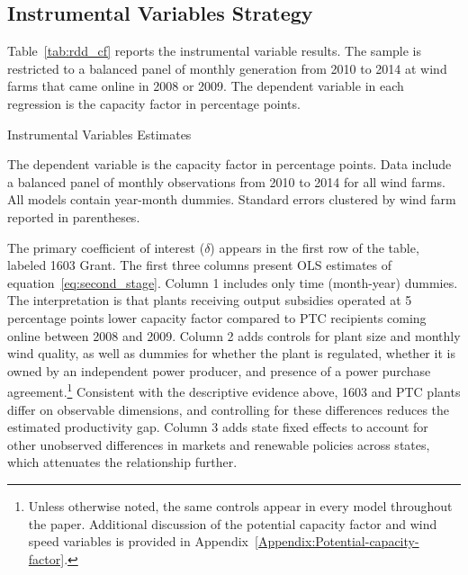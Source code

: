 \documentclass[12pt]{article}
\begin{document}
\subsection{Instrumental Variables Strategy\label{sec:results:rd}}

Table~\ref{tab:rdd_cf} reports the instrumental variable results. The sample is restricted to a balanced panel of monthly generation from 2010 to 2014 at wind farms that came online in 2008 or 2009. The dependent variable in each regression is the capacity factor in percentage points.

\begin{table}[h]
\caption{Instrumental Variables Estimates \label{tab:rdd_cf}}
\begin{center} {\footnotesize{}} \end{center}
\footnotesize
The dependent variable is the capacity factor in percentage points. Data include a balanced panel of monthly observations from 2010 to 2014 for all wind farms. All models contain year-month dummies. Standard errors clustered by wind farm reported in parentheses.
\end{table}

The primary coefficient of interest ($\delta$) appears in the first row of the table, labeled 1603 Grant. The first three columns present OLS estimates of equation~\ref{eq:second_stage}. Column 1 includes only time (month-year) dummies. The interpretation is that plants receiving output subsidies operated at 5 percentage points lower capacity factor compared to PTC recipients coming online between 2008 and 2009. Column 2 adds controls for plant size and monthly wind quality, as well as dummies for whether the plant is regulated, whether it is owned by an independent power producer, and presence of a power purchase agreement.\footnote{Unless otherwise noted, the same controls appear in every model throughout the paper. Additional discussion of the potential capacity factor and wind speed variables is provided in Appendix~\ref{Appendix:Potential-capacity-factor}.} Consistent with the descriptive evidence above, 1603 and PTC plants differ on observable dimensions, and controlling for these differences reduces the estimated productivity gap. Column 3 adds state fixed effects to account for other unobserved differences in markets and renewable policies across states, which attenuates the relationship further.
\end{document}
